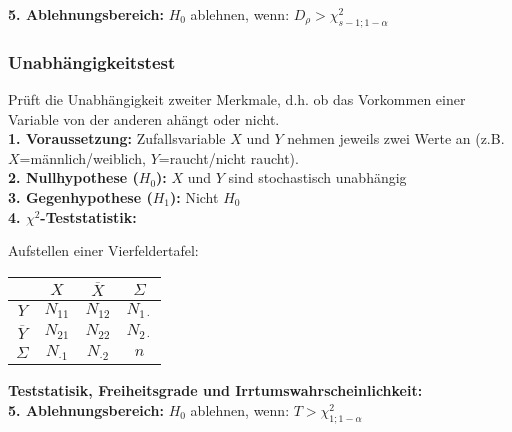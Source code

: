\textbf{5. Ablehnungsbereich:} \(H_0\) ablehnen, wenn:  \(D_{\rho} > \chi^2_{s-1;1-\alpha}\)\\


\subsubsection{Unabhängigkeitstest}

Prüft die Unabhängigkeit zweiter Merkmale, d.h. ob das Vorkommen einer Variable von der anderen ahängt oder nicht.\\


\textbf{1. Voraussetzung:} Zufallsvariable \(X\) und \(Y\) nehmen jeweils zwei Werte an (z.B. \(X\)=männlich/weiblich, \(Y\)=raucht/nicht raucht).\\

\textbf{2. Nullhypothese (\(H_0\)):} \(X\) und \(Y\) sind stochastisch unabhängig\\

\textbf{3. Gegenhypothese (\(H_1\)):} Nicht \(H_0\)\\

\textbf{4. \(\chi^2\)-Teststatistik:}

Aufstellen einer Vierfeldertafel:\\

\begin{tabular}{c|c|c|c}
               &$X$            &$\overline{X}$ &$\Sigma$\\ \hline
$Y$            &   \(N_{11}\)  &  \(N_{12}\)   & \(N_{1 \cdot} \) \\\hline
$\overline{Y}$ & \(N_{21}\)    &  \(N_{22}\) & \(N_{2\cdot} \) \\\hline
$\Sigma$       & $N_{\cdot 1}$ & $N_{\cdot 2}$ & $n$\\
\end{tabular}

\textbf{Teststatisik, Freiheitsgrade und Irrtumswahrscheinlichkeit:}\\

\textbf{5. Ablehnungsbereich:} \(H_0\) ablehnen, wenn:  \(T > \chi^2_{1;1-\alpha}\)\\